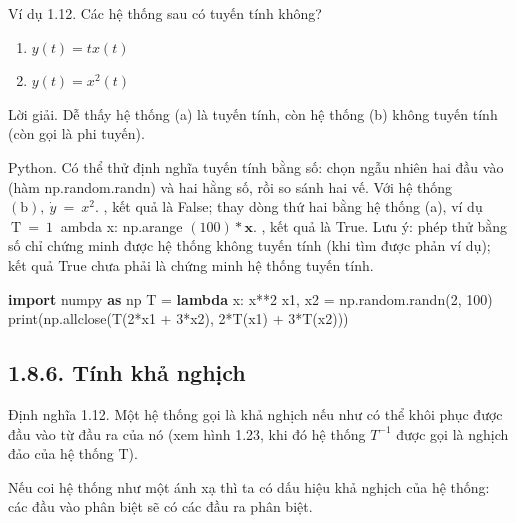 \documentclass[
  10
]{article}
\newenvironment{Shaded}{}{}
\newcommand{\BuiltInTok}[1]{\textcolor[rgb]{0.00,0.50,0.00}{#1}}
\newcommand{\DecValTok}[1]{\textcolor[rgb]{0.25,0.63,0.44}{#1}}
\newcommand{\ImportTok}[1]{\textcolor[rgb]{0.00,0.50,0.00}{\textbf{#1}}}
\newcommand{\KeywordTok}[1]{\textcolor[rgb]{0.00,0.44,0.13}{\textbf{#1}}}
\newcommand{\NormalTok}[1]{#1}
\newcommand{\OperatorTok}[1]{\textcolor[rgb]{0.40,0.40,0.40}{#1}}
\begin{document}
Ví dụ 1.12. Các hệ thống sau có tuyến tính không?

\begin{enumerate}
\def\labelenumi{(\alph{enumi})}
\item
  \(y ( t ) = t x ( t )\)
\item
  \(y ( t ) = x ^ { 2 } ( t )\)
\end{enumerate}

Lời giải. Dễ thấy hệ thống (a) là tuyến tính, còn hệ thống (b) không
tuyến tính (còn gọi là phi tuyến). 

Python. Có thể thử định nghĩa tuyến tính bằng số: chọn ngẫu nhiên hai
đầu vào (hàm np.random.randn) và hai hằng số, rồi so sánh hai vế. Với hệ
thống \(( \mathrm { b } ) , \ \dot { y } \ = \ x ^ { 2 } .\) , kết quả
là False; thay dòng thứ hai bằng hệ thống (a), ví dụ
\(\mathrm { ~ T ~ } = \mathrm { ~ 1 ~ }\) ambda x: np.arange
\(( 1 0 0 ) * \mathbf { x } .\) , kết quả là True. Lưu ý: phép thử bằng
số chỉ chứng minh được hệ thống không tuyến tính (khi tìm được phản ví
dụ); kết quả True chưa phải là chứng minh hệ thống tuyến tính.

\begin{Shaded}
\begin{Highlighting}[]
\ImportTok{import}\NormalTok{ numpy }\ImportTok{as}\NormalTok{ np}
\NormalTok{T }\OperatorTok{=} \KeywordTok{lambda}\NormalTok{ x: x}\OperatorTok{**}\DecValTok{2}
\NormalTok{x1, x2 }\OperatorTok{=}\NormalTok{ np.random.randn(}\DecValTok{2}\NormalTok{, }\DecValTok{100}\NormalTok{)}
\BuiltInTok{print}\NormalTok{(np.allclose(T(}\DecValTok{2}\OperatorTok{*}\NormalTok{x1 }\OperatorTok{+} \DecValTok{3}\OperatorTok{*}\NormalTok{x2), }\DecValTok{2}\OperatorTok{*}\NormalTok{T(x1) }\OperatorTok{+} \DecValTok{3}\OperatorTok{*}\NormalTok{T(x2))) }
\end{Highlighting}
\end{Shaded}

\subsection{1.8.6. Tính khả nghịch}\label{tuxednh-khux1ea3-nghux1ecbch}

Định nghĩa 1.12. Một hệ thống gọi là khả nghịch nếu như có thể khôi phục
được đầu vào từ đầu ra của nó (xem hình 1.23, khi đó hệ thống
\(T ^ { - 1 }\) được gọi là nghịch đảo của hệ thống T).

Nếu coi hệ thống như một ánh xạ thì ta có dấu hiệu khả nghịch của hệ
thống: các đầu vào phân biệt sẽ có các đầu ra phân biệt.
\end{document}
